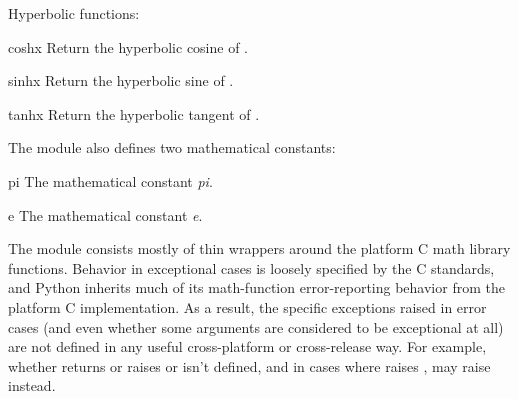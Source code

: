 Hyperbolic functions:

\begin{funcdesc}{cosh}{x}
Return the hyperbolic cosine of .
\end{funcdesc}

\begin{funcdesc}{sinh}{x}
Return the hyperbolic sine of .
\end{funcdesc}

\begin{funcdesc}{tanh}{x}
Return the hyperbolic tangent of .
\end{funcdesc}

The module also defines two mathematical constants:

\begin{datadesc}{pi}
The mathematical constant \emph{pi}.
\end{datadesc}

\begin{datadesc}{e}
The mathematical constant \emph{e}.
\end{datadesc}

\begin{notice}
  The  module consists mostly of thin wrappers around
  the platform C math library functions.  Behavior in exceptional cases is
  loosely specified by the C standards, and Python inherits much of its
  math-function error-reporting behavior from the platform C
  implementation.  As a result,
  the specific exceptions raised in error cases (and even whether some
  arguments are considered to be exceptional at all) are not defined in any
  useful cross-platform or cross-release way.  For example, whether
   returns  or raises  or
   isn't defined, and in
  cases where  raises ,
   may raise  instead.
\end{notice}

\begin{seealso}
\end{seealso}
